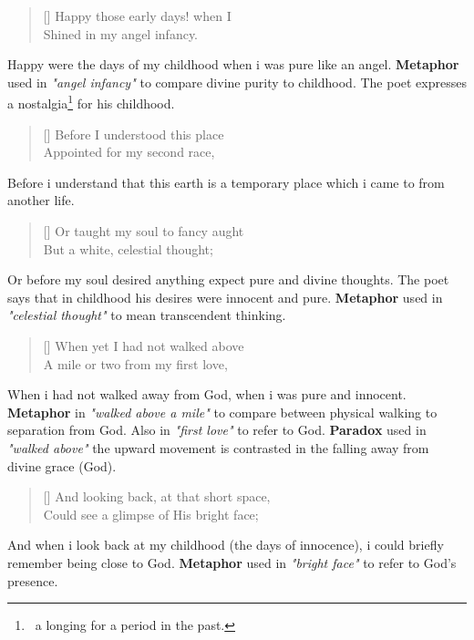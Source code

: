 \settowidth{\versewidth}{Happy those early days! when I}
\begin{verse}[\versewidth]
{\fontverse
Happy those early days! when I\\
Shined in my angel infancy.
} 
\end{verse}

Happy were the days of my childhood when i was pure like an angel.
\textbf{Metaphor} used in \textit{"angel infancy"} to compare divine purity to childhood.
The poet expresses a nostalgia\footnote{\, a longing for a period in the past.}
for his childhood.

\begin{verse}[\versewidth]
{\fontverse
Before I understood this place\\
Appointed for my second race, 
} 
\end{verse}

Before i understand that this earth is a temporary place which 
i came to from another life. 

\begin{verse}[\versewidth]
{\fontverse
Or taught my soul to fancy aught\\
But a white, celestial thought;
} 
\end{verse}

Or before my soul desired anything expect pure and divine thoughts.
The poet says that in childhood his desires were innocent and pure.
\textbf{Metaphor} used in \textit{"celestial thought"} to mean
transcendent thinking. 

\begin{verse}[\versewidth]
{\fontverse
When yet I had not walked above\\
A mile or two from my first love, 
} 
\end{verse}

When i had not walked away from God, when i was pure and innocent.
\textbf{Metaphor} in \textit{"walked above a mile"} to compare
between physical walking to separation from God. Also 
in \textit{"first love"} to refer to God. \textbf{Paradox} used in \textit{"walked above"}
the upward movement is contrasted in the falling away from divine grace (God).


\begin{verse}[\versewidth]
{\fontverse
And looking back, at that short space,\\
Could see a glimpse of His bright face;
} 
\end{verse}

And when i look back at my childhood (the days of innocence), i could
briefly remember being close to God. \textbf{Metaphor} used in \textit{"bright face"} 
to refer to God's presence. 

